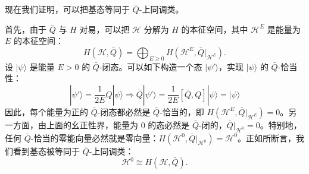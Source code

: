 现在我们证明，可以把基态等同于 $\bar Q$-上同调类。

首先，由于 $\bar Q$ 与 $H$ 对易，可以把 $\mathcal{H}$ 分解为 $H$ 的本征空间，其中 $\mathcal{H}^E$ 是能量为 $E$ 的本征空间：
\begin{equation}
  \tag{B.14}
  H(\mathcal{H},\bar Q)=\bigoplus_{E\geq0}H(\mathcal{H}^E,\bar Q|_{\mathcal{H}^E}).
\end{equation}
设 $|\psi\rangle$ 是能量 $E>0$ 的 $\bar Q$-闭态。可以如下构造一个态 $|\psi'\rangle$，实现 $|\psi\rangle$ 的 $\bar Q$-恰当性：
\begin{equation}
  \tag{B.15}
  |\psi'\rangle=\frac{1}{2E}Q|\psi\rangle\Rightarrow\bar Q|\psi'\rangle=\frac{1}{2E}[\bar Q,Q]|\psi\rangle=|\psi\rangle
\end{equation}
因此，每个能量为正的 $\bar Q$-闭态都必然是 $\bar Q$-恰当的，即 $H(\mathcal{H}^E,\bar Q|_{\mathcal{H}^E})=0$。另一方面，由上面的幺正性界，能量为 $0$ 的态必然是 $\bar Q$-闭的，$\bar Q|_{\mathcal{H}^0}=0$。特别地，任何 $\bar Q$-恰当的零能向量必然就是零向量：$H(\mathcal{H}^0,\bar Q|_{\mathcal{H}^0})=\mathcal{H}^0$。正如所断言，我们看到基态被等同于 $\bar Q$-上同调类：
\begin{equation}
  \tag{B.16}
  \mathcal{H}^0\cong H(\mathcal{H},\bar Q).
\end{equation}

